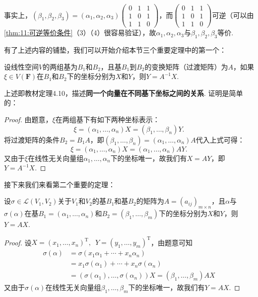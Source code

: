 \begin{solution}
    事实上，$(\beta_1,\beta_2,\beta_3)=(\alpha_1,\alpha_2,\alpha_3)\begin{pmatrix}
            0 & 1 & 1 \\
            1 & 0 & 1 \\
            1 & 1 & 0
        \end{pmatrix}$，而$\begin{pmatrix}
            0 & 1 & 1 \\
            1 & 0 & 1 \\
            1 & 1 & 0
        \end{pmatrix}$可逆（可以由\autoref{thm:11:可逆等价条件}（3）（4）很容易验证），故$\alpha_1,\alpha_2,\alpha_3$与$\beta_1,\beta_2,\beta_3$等价.
\end{solution}

有了上述内容的铺垫，我们可以开始介绍本节三个重要定理中的第一个：
\begin{theorem}[基的选择对向量坐标的影响] \label{thm:11:基的选择对向量坐标的影响}
    设线性空间$V$的两组基为$B_1$和$B_2$，且基$B_1$到$B_2$的变换矩阵（过渡矩阵）为$A$，如果$\xi \in V(\mathbf{F})$在$B_1$和$B_2$下的坐标分别为$X$和$Y$，则$Y=A^{-1}X$.
\end{theorem}
上述即教材定理4.10，描述\textbf{同一个向量在不同基下坐标之间的关系}. 证明是简单的：

\begin{proof}
    由题意，$\xi$在两组基下有如下两种坐标表示：
    \[\xi=(\alpha_1,\ldots,\alpha_n)X=(\beta_1,\ldots,\beta_n)Y.\]
    将过渡矩阵的条件$B_2=B_1A$，即$(\beta_1,\ldots,\beta_n)=(\alpha_1,\ldots,\alpha_n)A$代入上式可得：
    \[\xi=(\alpha_1,\ldots,\alpha_n)X=(\alpha_1,\ldots,\alpha_n)AY.\]
    又由于$\xi$在线性无关向量组$\alpha_1,\ldots,\alpha_n$下的坐标唯一，故我们有$X=AY$，即$Y=A^{-1}X$.
\end{proof}

接下来我们来看第二个重要的定理：
\begin{theorem}[线性映射对向量坐标的影响] \label{thm:11:线性映射对向量坐标的影响}
    设$\sigma \in \mathcal{L}(V_1,V_2)$关于$V_1$和$V_2$的基$B_1$和基$B_2$的矩阵为$A=(a_{ij})_{m \times n}$，且$\alpha$与$\sigma(\alpha)$在基$B_1=(\alpha_1,\ldots,\alpha_n)$和$B_2=(\beta_1,\ldots,\beta_m)$下的坐标分别为$X$和$Y$，则$Y=AX$.
\end{theorem}

\begin{proof}
    设$X=(x_1,\ldots,x_n)^\mathrm{T},\enspace Y=(y_1,\ldots,y_m)^\mathrm{T}$，由题意可知
    \begin{align*}
        \sigma(\alpha) & =\sigma(x_1\alpha_1+\cdots+x_n\alpha_n)                                 \\
                       & =x_1\sigma(\alpha_1)+\cdots+x_n\sigma(\alpha_n)                         \\
                       & =(\sigma(\alpha_1),\ldots,\sigma(\alpha_n))X=(\beta_1,\ldots,\beta_m)AX
    \end{align*}
    又由于$\sigma(\alpha)$在线性无关向量组$\beta_1,\ldots,\beta_m$下的坐标唯一，故我们有$Y=AX$.
\end{proof}

